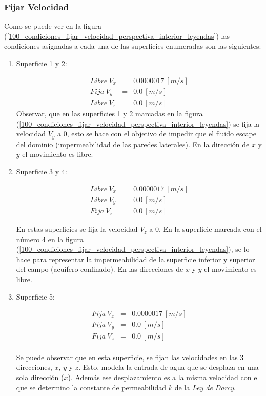 \documentclass[10pt,a4paper,final]{article}
\begin{document}
\subsubsection{Fijar Velocidad}
Como se puede ver en la figura (\ref{100_condiciones_fijar_velocidad_perspectiva_interior_leyendas}) las condiciones asignadas a cada una de las superficies enumeradas son las siguientes:

\begin{enumerate}

\item Superficie 1 y 2:

\begin{eqnarray*}
Libre~V_x&=&0.0000017~[m/s]\\
Fija~V_y&=&0.0~[m/s]\\
Libre~V_z&=&0.0~[m/s]
\end{eqnarray*}
Observar, que en las superficies 1 y 2 marcadas en la figura (\ref{100_condiciones_fijar_velocidad_perspectiva_interior_leyendas}) se fija la velocidad $V_y$ a $0$, esto se hace con el objetivo de impedir que el fluido escape del dominio (impermeabilidad de las paredes laterales). En la dirección de $x$ y $y$ el movimiento es libre.

\item Superficie 3 y 4:

\begin{eqnarray*}
Libre~V_x&=&0.0000017~[m/s]\\
Libre~V_y&=&0.0~[m/s]\\
Fija~V_z&=&0.0~[m/s]
\end{eqnarray*}

En estas superficies se fija la velocidad $V_z$ a $0$. En la superficie marcada con el número 4 en la figura (\ref{100_condiciones_fijar_velocidad_perspectiva_interior_leyendas}), se lo hace para representar la impermeabilidad de la superficie inferior y superior del campo (acuífero confinado). En las direcciones de $x$ y $y$ el movimiento es libre.

\item Superficie 5:

\begin{eqnarray*}
Fija~V_x&=&0.0000017~[m/s]\\
Fija~V_y&=&0.0~[m/s]\\
Fija~V_z&=&0.0~[m/s]\\
\end{eqnarray*}

Se puede observar que en esta superficie, se fijan las velocidades en las 3 direcciones, $x$, $y$ y $z$. Esto, modela la entrada de agua que se desplaza en una sola dirección ($x$). Además ese desplazamiento es a la misma velocidad con el que se determino la constante de permeabilidad $k$ de la \emph{Ley de Darcy}.
\end{enumerate}
\end{document}
